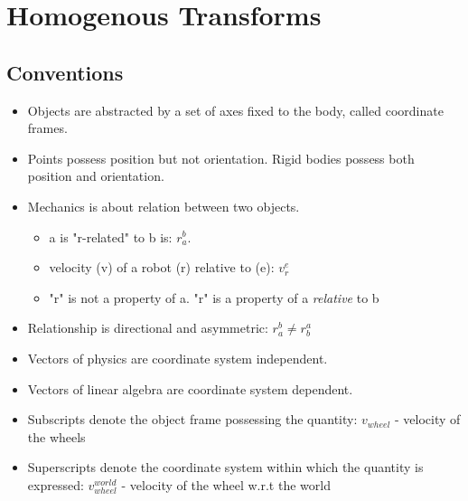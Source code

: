 \documentclass[../main.tex]{subfiles}
\begin{document}
\section{Homogenous Transforms}
\subsection{Conventions}
  \begin{itemize}
    \item Objects are abstracted by a set of axes fixed to the body, called coordinate frames.
    \item Points possess position but not orientation. Rigid bodies possess both position and orientation.
    \item Mechanics is about relation between two objects.
    \begin{itemize}
      \item a is "r-related" to b is: $r_{a}^{b}$.
      \item velocity (v) of a robot (r) relative to (e): $v_{r}^{e}$
      \item "r" is not a property of a. "r" is a property of a \textit{relative} to b
    \end{itemize}
    \item Relationship is directional and asymmetric: $r_{a}^{b} \neq r_{b}^{a}$
    \item Vectors of physics are coordinate system independent.
    \item Vectors of linear algebra are coordinate system dependent.
    \item Subscripts denote the object frame possessing the quantity: $v_{wheel}$ - velocity of the wheels
    \item Superscripts denote the coordinate system within which the quantity is expressed: $v_{wheel}^{world}$ - velocity of the wheel w.r.t the world
  \end{itemize}
\end{document}
